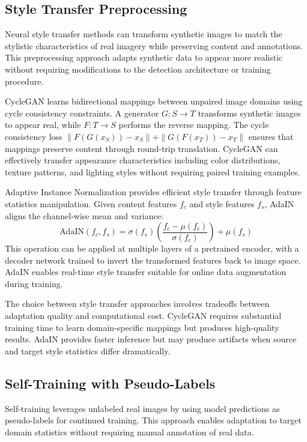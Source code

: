 \subsection{Style Transfer Preprocessing}

Neural style transfer methods can transform synthetic images to match the stylistic characteristics of real imagery while preserving content and annotations. This preprocessing approach adapts synthetic data to appear more realistic without requiring modifications to the detection architecture or training procedure.

CycleGAN learns bidirectional mappings between unpaired image domains using cycle consistency constraints. A generator $G: S \to T$ transforms synthetic images to appear real, while $F: T \to S$ performs the reverse mapping. The cycle consistency loss $\|F(G(x_S)) - x_S\| + \|G(F(x_T)) - x_T\|$ ensures that mappings preserve content through round-trip translation. CycleGAN can effectively transfer appearance characteristics including color distributions, texture patterns, and lighting styles without requiring paired training examples.

Adaptive Instance Normalization provides efficient style transfer through feature statistics manipulation. Given content features $f_c$ and style features $f_s$, AdaIN aligns the channel-wise mean and variance:
\begin{equation}
\text{AdaIN}(f_c, f_s) = \sigma(f_s) \left( \frac{f_c - \mu(f_c)}{\sigma(f_c)} \right) + \mu(f_s)
\end{equation}
This operation can be applied at multiple layers of a pretrained encoder, with a decoder network trained to invert the transformed features back to image space. AdaIN enables real-time style transfer suitable for online data augmentation during training.

The choice between style transfer approaches involves tradeoffs between adaptation quality and computational cost. CycleGAN requires substantial training time to learn domain-specific mappings but produces high-quality results. AdaIN provides faster inference but may produce artifacts when source and target style statistics differ dramatically.

\subsection{Self-Training with Pseudo-Labels}

Self-training leverages unlabeled real images by using model predictions as pseudo-labels for continued training. This approach enables adaptation to target domain statistics without requiring manual annotation of real data.

